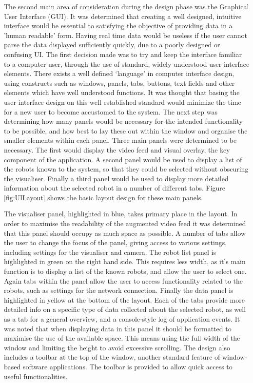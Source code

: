 The second main area of consideration during the design phase was the Graphical User Interface (GUI). It was determined that creating a well designed, intuitive interface would be essential to satisfying the objective of providing data in a 'human readable' form. Having real time data would be useless if the user cannot parse the data displayed sufficiently quickly, due to a poorly designed or confusing UI. The first decision made was to try and keep the interface familiar to a computer user, through the use of standard, widely understood user interface elements. There exists a well defined `language' in computer interface design, using constructs such as windows, panels, tabs, buttons, text fields and other elements which have well understood functions. It was thought that basing the user interface design on this well established standard would minimize the time for a new user to become accustomed to the system. The next step was determining how many panels would be necessary for the intended functionality to be possible, and how best to lay these out within the window and organise the smaller elements within each panel. Three main panels were determined to be necessary. The first would display the video feed and visual overlay, the key component of the application. A second panel would be used to display a list of the robots known to the system, so that they could be selected without obscuring the visualiser. Finally a third panel would be used to display more detailed information about the selected robot in a number of different tabs. Figure \ref{fig:UILayout} shows the basic layout design for these main panels.

The visualiser panel, highlighted in blue, takes primary place in the layout. In order to maximise the readability of the augmented video feed it was determined that this panel should occupy as much space as possible. A number of tabs allow the user to change the focus of the panel, giving access to various settings, including settings for the visualiser and camera. The robot list panel is highlighted in green on the right hand side. This requires less width, as it's main function is to display a list of the known robots, and allow the user to select one. Again tabs within the panel allow the user to access functionality related to the robots, such as settings for the network connection. Finally the data panel is highlighted in yellow at the bottom of the layout. Each of the tabs provide more detailed info on a specific type of data collected about the selected robot, as well as a tab for a general overview, and a console-style log of application events. It was noted that when displaying data in this panel it should be formatted to maximise the use of the available space. This means using the full width of the window and limiting the height to avoid excessive scrolling. The design also includes a toolbar at the top of the window, another standard feature of window-based software applications. The toolbar is provided to allow quick access to useful functionalities.


